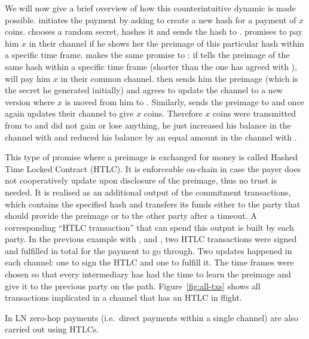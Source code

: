     We will now give a brief overview of how this counterintuitive dynamic
    is made possible. \alice{} initiates the payment by asking \charlie{} to
    create a new hash for a payment of $x$ coins. \charlie{} chooses a random
    secret, hashes it and sends the hash to \alice. \alice{} promises \bob{} to
    pay him $x$ in their channel if he shows her the preimage of this particular
    hash within a specific time frame. \bob{} makes the same promise to
    \charlie{}: if \charlie{} tells \bob{} the preimage of the same hash within
    a specific time frame (shorter than the one \bob{} has agreed with
    \alice{}), \bob{} will pay him $x$ in their common channel. \charlie{} then
    sends him the preimage (which is the secret he generated initially) and
    \bob{} agrees to update the channel to a new version where $x$ is moved from
    him to \charlie. Similarly, \bob{} sends the preimage to \alice{} and once
    again \alice{} updates their channel to give \bob{} $x$ coins. Therefore $x$
    coins were transmitted from \alice{} to \charlie{} and \bob{} did not gain
    or lose anything, he just increased his balance in the channel with \alice{}
    and reduced his balance by an equal amount in the channel with \charlie.

    This type of promise where a preimage is exchanged for money is called
    Hashed Time Locked Contract (HTLC). It is enforceable on-chain in case the
    payer does not cooperatively update upon disclosure of the preimage, thus no
    trust is needed. It is realised as an additional output of the
    commitment transactions, which contains the specified hash and transfers its
    funds either to the party that should provide the preimage or to the other
    party after a timeout. A corresponding ``HTLC transaction'' that can spend
    this output is built by each party. In the previous example with \alice{},
    \bob{} and \charlie, two HTLC transactions were signed and
    fulfilled in total for the payment to go through. Two updates
    happened in each channel: one to sign the HTLC and one to fulfill it. The
    time frames were chosen so that every intermediary has had the time to learn
    the preimage and give it to the previous party on the path.
    Figure~\ref{fig:all-txs} shows all transactions implicated in a
    channel that has an HTLC in flight.

    In LN zero-hop payments (i.e.\ direct payments within a single channel) are
    also carried out using HTLCs.

